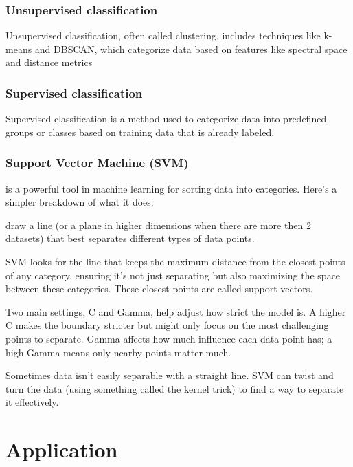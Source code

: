 \documentclass[
  letterpaper,
  DIV=11,
  numbers=noendperiod]{scrreprt}
\begin{document}
\subsection{Unsupervised
classification}\label{unsupervised-classification}

Unsupervised classification, often called clustering, includes
techniques like k-means and DBSCAN, which categorize data based on
features like spectral space and distance metrics

\subsection{Supervised classification}\label{supervised-classification}

Supervised classification is a method used to categorize data into
predefined groups or classes based on training data that is already
labeled.

\subsection{Support Vector Machine
(SVM)}\label{support-vector-machine-svm}

is a powerful tool in machine learning for sorting data into categories.
Here's a simpler breakdown of what it does:

draw a line (or a plane in higher dimensions when there are more then 2
datasets) that best separates different types of data points.

SVM looks for the line that keeps the maximum distance from the closest
points of any category, ensuring it's not just separating but also
maximizing the space between these categories. These closest points are
called support vectors.

Two main settings, C and Gamma, help adjust how strict the model is. A
higher C makes the boundary stricter but might only focus on the most
challenging points to separate. Gamma affects how much influence each
data point has; a high Gamma means only nearby points matter much.

Sometimes data isn't easily separable with a straight line. SVM can
twist and turn the data (using something called the kernel trick) to
find a way to separate it effectively.


\chapter{Application}\label{application-3}
\end{document}
